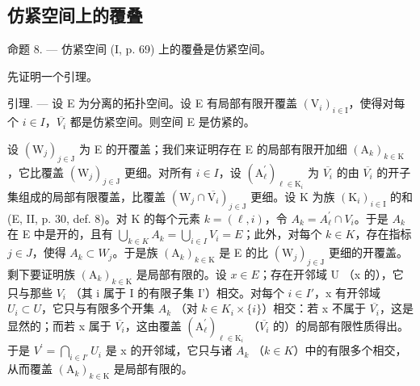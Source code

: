 \subsection{仿紧空间上的覆叠}

命题 8. --- 仿紧空间 (I, p. 69) 上的覆叠是仿紧空间。

先证明一个引理。

引理. --- 设 E 为分离的拓扑空间。设 E 有局部有限开覆盖 \((\mathrm{V}_{i})_{i\in\mathrm{I}}\)，使得对每个 \(i\in I\)，\(\overline{V_{i}}\) 都是仿紧空间。则空间 E 是仿紧的。

设 \((\mathrm{W}_{j})_{j\in\mathrm{J}}\) 为 E 的开覆盖；我们来证明存在 E 的局部有限开加细 \((\mathrm{A}_{k})_{k\in\mathrm{K}}\)，它比覆盖 \((\mathrm{W}_{j})_{j\in\mathrm{J}}\) 更细。对所有 \(i\in I\)，设 \((\mathrm{A}_{\ell}^{\prime})_{\ell\in\mathrm{K}_{i}}\) 为 \(\overline{V_{i}}\) 的由 \(\overline{V_{i}}\) 的开子集组成的局部有限覆盖，比覆盖 \((\mathrm{W}_{j}\cap\overline{\mathrm{V}_{i}})_{j\in\mathrm{J}}\) 更细。设 K 为族 \((\mathrm{K}_{i})_{i\in\mathrm{I}}\) 的和 (E, II, p. 30, def. 8)。对 K 的每个元素 \(k=(\ell,i)\)，令 \(A_{k}=A_{\ell}^{\prime}\cap V_{i}\)。于是 \(A_{k}\) 在 E 中是开的，且有 \(\bigcup_{k\in K}A_{k}=\bigcup_{i\in I}V_{i}=E\)；此外，对每个 \(k\in K\)，存在指标 \(j\in J\)，使得 \(A_{k}\subset W_{j}\)。于是族 \((\mathrm{A}_{k})_{k\in\mathrm{K}}\) 是 E 的比 \((\mathrm{W}_{j})_{j\in\mathrm{J}}\) 更细的开覆盖。剩下要证明族 \((\mathrm{A}_{k})_{k\in\mathrm{K}}\) 是局部有限的。设 \(x\in E\)；存在开邻域 U （x 的），它只与那些 \(V_{i}\) （其 i 属于 I 的有限子集 I'）相交。对每个 \(i\in I'\)，x 有开邻域 \(U_{i}\subset U\)，它只与有限多个开集 \(A_{k}\) （对 \(k\in K_{i}\times\{i\}\)）相交：若 x 不属于 \(\overline{V_{i}}\)，这是显然的；而若 x 属于 \(\overline{V_{i}}\)，这由覆盖 \((\mathrm{A}_{\ell}^{\prime})_{\ell\in\mathrm{K}_{i}}\) （\(\overline{V_{i}}\) 的）的局部有限性质得出。于是 \(V^{\prime}=\bigcap_{i\in I'}U_{i}\) 是 x 的开邻域，它只与诸 \(A_{k}\) （\(k\in K\)）中的有限多个相交，从而覆盖 \((\mathrm{A}_{k})_{k\in\mathrm{K}}\) 是局部有限的。

